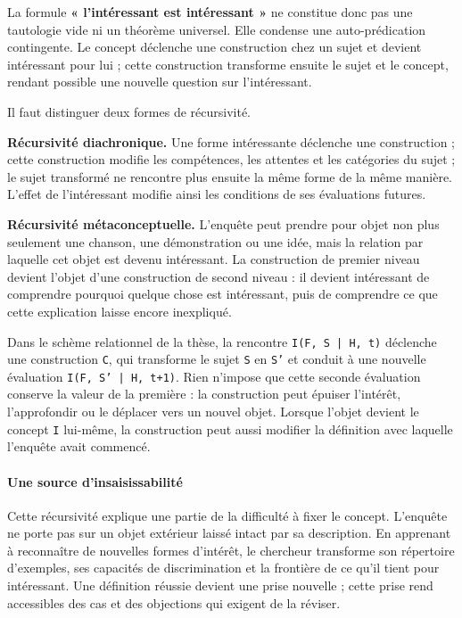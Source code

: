\documentclass[10pt,a4paper]{article}
\begin{document}
La formule \textbf{« l'intéressant est intéressant »} ne constitue donc pas une tautologie vide ni un théorème universel. Elle condense une auto-prédication contingente. Le concept déclenche une construction chez un sujet et devient intéressant pour lui ; cette construction transforme ensuite le sujet et le concept, rendant possible une nouvelle question sur l'intéressant.

Il faut distinguer deux formes de récursivité.

\textbf{Récursivité diachronique.} Une forme intéressante déclenche une construction ; cette construction modifie les compétences, les attentes et les catégories du sujet ; le sujet transformé ne rencontre plus ensuite la même forme de la même manière. L'effet de l'intéressant modifie ainsi les conditions de ses évaluations futures.

\textbf{Récursivité métaconceptuelle.} L'enquête peut prendre pour objet non plus seulement une chanson, une démonstration ou une idée, mais la relation par laquelle cet objet est devenu intéressant. La construction de premier niveau devient l'objet d'une construction de second niveau : il devient intéressant de comprendre pourquoi quelque chose est intéressant, puis de comprendre ce que cette explication laisse encore inexpliqué.

Dans le schème relationnel de la thèse, la rencontre \texttt{I(F, S | H, t)} déclenche une construction \texttt{C}, qui transforme le sujet \texttt{S} en \texttt{S'} et conduit à une nouvelle évaluation \texttt{I(F, S' | H, t+1)}. Rien n'impose que cette seconde évaluation conserve la valeur de la première : la construction peut épuiser l'intérêt, l'approfondir ou le déplacer vers un nouvel objet. Lorsque l'objet devient le concept \texttt{I} lui-même, la construction peut aussi modifier la définition avec laquelle l'enquête avait commencé.

\paragraph{Une source d'insaisissabilité}
Cette récursivité explique une partie de la difficulté à fixer le concept. L'enquête ne porte pas sur un objet extérieur laissé intact par sa description. En apprenant à reconnaître de nouvelles formes d'intérêt, le chercheur transforme son répertoire d'exemples, ses capacités de discrimination et la frontière de ce qu'il tient pour intéressant. Une définition réussie devient une prise nouvelle ; cette prise rend accessibles des cas et des objections qui exigent de la réviser.
\end{document}
